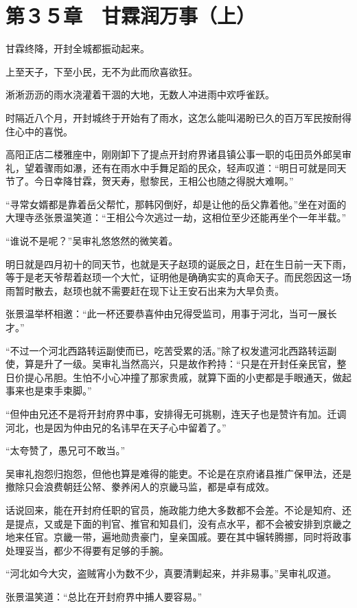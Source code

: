 \section{第３５章　甘霖润万事（上）}

甘霖终降，开封全城都振动起来。

上至天子，下至小民，无不为此而欣喜欲狂。

淅淅沥沥的雨水浇灌着干涸的大地，无数人冲进雨中欢呼雀跃。

时隔近八个月，开封城终于开始有了雨水，这怎么能叫渴盼已久的百万军民按耐得住心中的喜悦。

高阳正店二楼雅座中，刚刚卸下了提点开封府界诸县镇公事一职的屯田员外郎吴审礼，望着骤雨如瀑，还有在雨水中手舞足蹈的民众，轻声叹道：“明日可就是同天节了。今日幸降甘霖，贺天寿，慰黎民，王相公也随之得脱大难啊。”

“寻常女婿都是靠着岳父帮忙，那韩冈倒好，却是让他的岳父靠着他。”坐在对面的大理寺丞张景温笑道：“王相公今次逃过一劫，这相位至少还能再坐个一年半载。”

“谁说不是呢？”吴审礼悠悠然的微笑着。

明日就是四月初十的同天节，也就是天子赵顼的诞辰之日，赶在生日前一天下雨，等于是老天爷帮着赵顼一个大忙，证明他是确确实实的真命天子。而民怨因这一场雨暂时散去，赵顼也就不需要赶在现下让王安石出来为大旱负责。

张景温举杯相邀：“此一杯还要恭喜仲由兄得受监司，用事于河北，当可一展长才。”

“不过一个河北西路转运副使而已，吃苦受累的活。”除了权发遣河北西路转运副使，算是升了一级。吴审礼当然高兴，只是故作矜持：“只是在开封任亲民官，整日价提心吊胆。生怕不小心冲撞了那家贵戚，就算下面的小吏都是手眼通天，做起事来也是束手束脚。”

“但仲由兄还不是将开封府界中事，安排得无可挑剔，连天子也是赞许有加。迁调河北，也是因为仲由兄的名讳早在天子心中留着了。”

“太夸赞了，愚兄可不敢当。”

吴审礼抱怨归抱怨，但他也算是难得的能吏。不论是在京府诸县推广保甲法，还是撤除只会浪费朝廷公帑、豢养闲人的京畿马监，都是卓有成效。

话说回来，能在开封府任职的官员，施政能力绝大多数都不会差。不论是知府、还是提点，又或是下面的判官、推官和知县们，没有点水平，都不会被安排到京畿之地来任官。京畿一带，遍地勋贵豪门，皇亲国戚。要在其中辗转腾挪，同时将政事处理妥当，都少不得要有足够的手腕。

“河北如今大灾，盗贼宵小为数不少，真要清剿起来，并非易事。”吴审礼叹道。

张景温笑道：“总比在开封府界中捕人要容易。”

